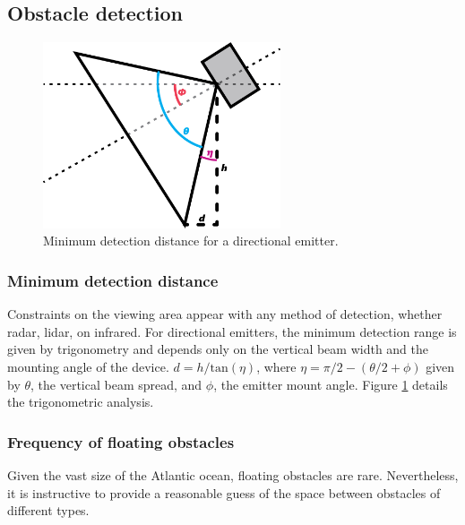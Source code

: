 \appendix
\renewcommand{\thesubsection}{\Alph{subsection}}
\renewcommand{\thesubsubsection}{\thesubsection.\arabic{subsubsection}}

\subsection{\label{app:AppendixA}Obstacle detection} 

\begin{figure}[h]
\includegraphics[width=70mm,natwidth=505,natheight=394]{"./image/directional-emitters"}
\caption[Minimum distance to detected obstacle.]{\label{fig:emitter-angle}Minimum detection distance for a directional emitter.}
\end{figure}

\subsubsection{\label{app:minimum-detection-distance}Minimum detection distance}
Constraints on the viewing area appear with any method of detection, whether radar, lidar, on infrared. For directional emitters, the minimum detection range is given by trigonometry and depends only on the vertical beam width and the mounting angle of the device. $d = h/\text{tan}(\eta)$, where $\eta=\pi/2-(\theta/2+\phi)$ given by $\theta$, the vertical beam spread, and $\phi$, the emitter mount angle. Figure \ref{fig:emitter-angle} details the trigonometric analysis.

\subsubsection{\label{app:obstacle-frequency}Frequency of floating obstacles}
Given the vast size of the Atlantic ocean, floating obstacles are rare. Nevertheless, it is instructive to provide a reasonable guess of the space between obstacles of different types.

